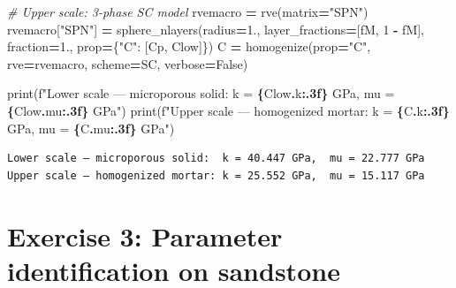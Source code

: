 \documentclass[
  a4paper,
  numbers=noendperiod,
  DIV=12]{scrreprt}
\newenvironment{Shaded}{\begin{snugshade}}{\end{snugshade}}
\newcommand{\BuiltInTok}[1]{#1}
\newcommand{\CommentTok}[1]{\textcolor[rgb]{0.56,0.35,0.01}{\textit{#1}}}
\newcommand{\DecValTok}[1]{\textcolor[rgb]{0.00,0.00,0.81}{#1}}
\newcommand{\FloatTok}[1]{\textcolor[rgb]{0.00,0.00,0.81}{#1}}
\newcommand{\NormalTok}[1]{#1}
\newcommand{\OperatorTok}[1]{\textcolor[rgb]{0.81,0.36,0.00}{\textbf{#1}}}
\newcommand{\SpecialCharTok}[1]{\textcolor[rgb]{0.81,0.36,0.00}{\textbf{#1}}}
\newcommand{\SpecialStringTok}[1]{\textcolor[rgb]{0.31,0.60,0.02}{#1}}
\newcommand{\StringTok}[1]{\textcolor[rgb]{0.31,0.60,0.02}{#1}}
\newcommand{\VariableTok}[1]{\textcolor[rgb]{0.00,0.00,0.00}{#1}}
\begin{document}
\begin{tcolorbox}
\begin{Shaded}
\begin{Highlighting}[]
\CommentTok{\# Upper scale: 3{-}phase SC model}
\NormalTok{rvemacro }\OperatorTok{=}\NormalTok{ rve(matrix}\OperatorTok{=}\StringTok{"SPN"}\NormalTok{)}
\NormalTok{rvemacro[}\StringTok{"SPN"}\NormalTok{] }\OperatorTok{=}\NormalTok{ sphere\_nlayers(radius}\OperatorTok{=}\FloatTok{1.}\NormalTok{, layer\_fractions}\OperatorTok{=}\NormalTok{[fM, }\DecValTok{1} \OperatorTok{{-}}\NormalTok{ fM],}
\NormalTok{                                  fraction}\OperatorTok{=}\FloatTok{1.}\NormalTok{, prop}\OperatorTok{=}\NormalTok{\{}\StringTok{"C"}\NormalTok{: [Cp, Clow]\})}
\NormalTok{C }\OperatorTok{=}\NormalTok{ homogenize(prop}\OperatorTok{=}\StringTok{"C"}\NormalTok{, rve}\OperatorTok{=}\NormalTok{rvemacro, scheme}\OperatorTok{=}\NormalTok{SC, verbose}\OperatorTok{=}\VariableTok{False}\NormalTok{)}

\BuiltInTok{print}\NormalTok{(}\SpecialStringTok{f"Lower scale — microporous solid:  k = }\SpecialCharTok{\{}\NormalTok{Clow}\SpecialCharTok{.}\NormalTok{k}\SpecialCharTok{:.3f\}}\SpecialStringTok{ GPa,  mu = }\SpecialCharTok{\{}\NormalTok{Clow}\SpecialCharTok{.}\NormalTok{mu}\SpecialCharTok{:.3f\}}\SpecialStringTok{ GPa"}\NormalTok{)}
\BuiltInTok{print}\NormalTok{(}\SpecialStringTok{f"Upper scale — homogenized mortar: k = }\SpecialCharTok{\{}\NormalTok{C}\SpecialCharTok{.}\NormalTok{k}\SpecialCharTok{:.3f\}}\SpecialStringTok{ GPa,  mu = }\SpecialCharTok{\{}\NormalTok{C}\SpecialCharTok{.}\NormalTok{mu}\SpecialCharTok{:.3f\}}\SpecialStringTok{ GPa"}\NormalTok{)}
\end{Highlighting}
\end{Shaded}

\begin{verbatim}
Lower scale — microporous solid:  k = 40.447 GPa,  mu = 22.777 GPa
Upper scale — homogenized mortar: k = 25.552 GPa,  mu = 15.117 GPa
\end{verbatim}

\end{tcolorbox}

\section{Exercise 3: Parameter identification on
sandstone}\label{sec-exo-sandstone}
\end{document}

